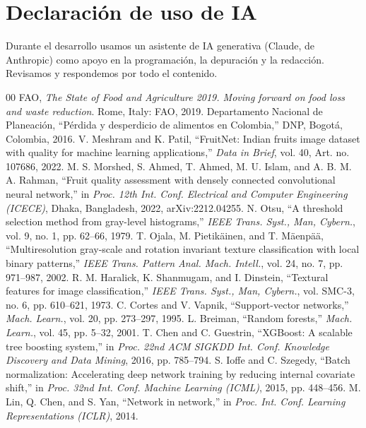 \documentclass[conference]{IEEEtran}
\begin{document}
\section*{Declaración de uso de IA}
Durante el desarrollo usamos un asistente de IA generativa (Claude, de Anthropic) como apoyo en la programación, la depuración y la redacción. Revisamos y respondemos por todo el contenido.

\begin{thebibliography}{00}
 FAO, \textit{The State of Food and Agriculture 2019. Moving forward on food loss and waste reduction}. Rome, Italy: FAO, 2019.
 Departamento Nacional de Planeación, ``Pérdida y desperdicio de alimentos en Colombia,'' DNP, Bogotá, Colombia, 2016.
 V. Meshram and K. Patil, ``FruitNet: Indian fruits image dataset with quality for machine learning applications,'' \textit{Data in Brief}, vol. 40, Art. no. 107686, 2022.
 M. S. Morshed, S. Ahmed, T. Ahmed, M. U. Islam, and A. B. M. A. Rahman, ``Fruit quality assessment with densely connected convolutional neural network,'' in \textit{Proc. 12th Int. Conf. Electrical and Computer Engineering (ICECE)}, Dhaka, Bangladesh, 2022, arXiv:2212.04255.
 N. Otsu, ``A threshold selection method from gray-level histograms,'' \textit{IEEE Trans. Syst., Man, Cybern.}, vol. 9, no. 1, pp. 62--66, 1979.
 T. Ojala, M. Pietikäinen, and T. Mäenpää, ``Multiresolution gray-scale and rotation invariant texture classification with local binary patterns,'' \textit{IEEE Trans. Pattern Anal. Mach. Intell.}, vol. 24, no. 7, pp. 971--987, 2002.
 R. M. Haralick, K. Shanmugam, and I. Dinstein, ``Textural features for image classification,'' \textit{IEEE Trans. Syst., Man, Cybern.}, vol. SMC-3, no. 6, pp. 610--621, 1973.
 C. Cortes and V. Vapnik, ``Support-vector networks,'' \textit{Mach. Learn.}, vol. 20, pp. 273--297, 1995.
 L. Breiman, ``Random forests,'' \textit{Mach. Learn.}, vol. 45, pp. 5--32, 2001.
 T. Chen and C. Guestrin, ``XGBoost: A scalable tree boosting system,'' in \textit{Proc. 22nd ACM SIGKDD Int. Conf. Knowledge Discovery and Data Mining}, 2016, pp. 785--794.
 S. Ioffe and C. Szegedy, ``Batch normalization: Accelerating deep network training by reducing internal covariate shift,'' in \textit{Proc. 32nd Int. Conf. Machine Learning (ICML)}, 2015, pp. 448--456.
 M. Lin, Q. Chen, and S. Yan, ``Network in network,'' in \textit{Proc. Int. Conf. Learning Representations (ICLR)}, 2014.

\end{thebibliography}
\end{document}
